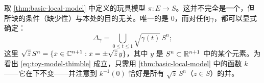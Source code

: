 \begin{example}\label{thm:toy-model-thimble}
取 \cref{thm:basic-local-model} 中定义的玩具模型 $\pi\colon E\to S$。这并不完全是一个\trLefschetzFibration{}，但所缺的条件（缺少\trHolomorphic\trConvex{}性）与本处的目的无关。唯一的\trCriticalValue{}是 $0$，而对任何\trVanishingPath{}$\gamma$，\trLefschetzThimble{}都可以显式确定：
\begin{equation}\label{eq:toy-model-thimble}
\Delta_\gamma=\bigcup_{0\le t\le 1}\sqrt{\gamma(t)}\,S^n;
\end{equation}
这里 $\sqrt{\bar{z}}\,S^n=\{x\in\mathbb{C}^{n+1}:x=\pm\sqrt{\bar{z}}\,y\}$，其中 $y$ 是 $S^n\subset\mathbb{R}^{n+1}$ 中的某个元素。为看出 \eqref{eq:toy-model-thimble} 成立，只需用 \cref{thm:basic-local-model} 中的函数 $k$——它在\trParallelTransport{}下不变——并注意到 $k^{-1}(0)$ 恰好是所有 $\sqrt{\bar{z}}\,S^n$（$z\in S$）的并。
\end{example}
